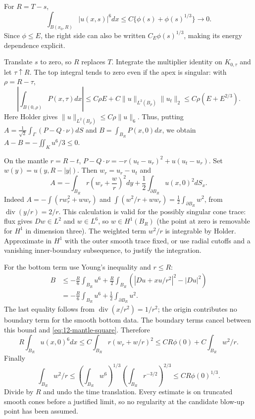 \begin{theorem}
For $R=T-s$,
\begin{equation}\label{eq:12-nonconcentration}
 \int_{B(x_0,R)}|u(x,s)|^6dx
       \le C\{\phi(s)+\phi(s)^{1/3}\}\longrightarrow0.
\end{equation}
Since $\phi\le E$, the right side can also be written
$C_E\phi(s)^{1/3}$, making its energy dependence explicit.
\end{theorem}
\begin{expandedproof}
Translate $s$ to zero, so $R$ replaces $T$. Integrate the multiplier
identity on $K_{0,\tau}$ and let $\tau\uparrow R$.
The top integral tends to zero even if the apex is singular:
with $\rho=R-\tau$,
\[
 \left|\int_{B(0,\rho)}P(x,\tau)dx\right|
 \le C\rho E+C\|u\|_{L^2(B_\rho)}\|u_t\|_2
 \le C\rho(E+E^{2/3}).
\]
Here Holder gives $\|u\|_{L^2(B_\rho)}\le C\rho\|u\|_6$.
Thus, putting
$A=\frac1{\sqrt2}\int_\Gamma(P-Q\cdot\nu)dS$ and
$B=\int_{B_R}P(x,0)dx$, we obtain $A-B=-\iint_Ku^6/3\le0$.

On the mantle $r=R-t$,
$P-Q\cdot\nu=-r(u_t-u_r)^2+u(u_t-u_r)$.
Set $w(y)=u(y,R-|y|)$. Then $w_r=u_r-u_t$ and
\begin{equation}\label{eq:12-mantle-square}
 A=-\int_{B_R}r\left(w_r+\frac wr\right)^2dy
                      +\frac12\int_{\partial B_R}u(x,0)^2dS_x.
\end{equation}
Indeed $A=-\int(rw_r^2+ww_r)$ and
$\int(w^2/r+ww_r)=\frac12\int_{\partial B_R}w^2$, from
$\operatorname{div}(y/r)=2/r$.
This calculation is valid for the possibly singular cone trace:
flux gives $Dw\in L^2$ and $w\in L^6$, so $w\in H^1(B_R)$
(the point at zero is removable for $H^1$ in dimension three).
The weighted term $w^2/r$ is integrable by Holder. Approximate in
$H^1$ with the outer smooth trace fixed, or use radial cutoffs and
a vanishing inner-boundary subsequence, to justify the integration.

For the bottom term use Young's inequality and $r\le R$:
\[
 \begin{split}
 B&\le-\frac R6\int_{B_R}u^6
       +\frac R2\int_{B_R}(|Du+xu/r^2|^2-|Du|^2)\\
  &=-\frac R6\int_{B_R}u^6+\frac12\int_{\partial B_R}u^2.
 \end{split}
\]
The last equality follows from $\operatorname{div}(x/r^2)=1/r^2$;
the origin contributes no boundary term for the smooth bottom data.
The boundary terms cancel between this bound and
\eqref{eq:12-mantle-square}. Therefore
\[
 R\int_{B_R}u(x,0)^6dx
 \le C\int_{B_R}r(w_r+w/r)^2
 \le CR\phi(0)+C\int_{B_R}w^2/r.
\]
Finally
\[
 \int_{B_R}w^2/r
 \le\left(\int_{B_R}w^6\right)^{1/3}
      \left(\int_{B_R}r^{-3/2}\right)^{2/3}
 \le CR\phi(0)^{1/3}.
\]
Divide by $R$ and undo the time translation. Every estimate is on
truncated smooth cones before a justified limit, so no regularity
at the candidate blow-up point has been assumed.
\end{expandedproof}

